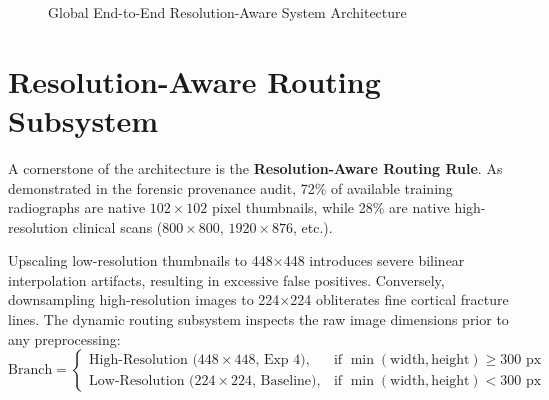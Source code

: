 \documentclass[12pt, a4paper]{report}
\begin{document}
\begin{figure}[htbp]
\caption{Global End-to-End Resolution-Aware System Architecture}
\label{fig:arch_flow}
\end{figure}

\section{Resolution-Aware Routing Subsystem}
A cornerstone of the architecture is the \textbf{Resolution-Aware Routing Rule}. As demonstrated in the forensic provenance audit, 72\% of available training radiographs are native $102\times 102$ pixel thumbnails, while 28\% are native high-resolution clinical scans ($800\times 800$, $1920\times 876$, etc.). 

Upscaling low-resolution thumbnails to 448$\times$448 introduces severe bilinear interpolation artifacts, resulting in excessive false positives. Conversely, downsampling high-resolution images to 224$\times$224 obliterates fine cortical fracture lines. The dynamic routing subsystem inspects the raw image dimensions prior to any preprocessing:
\begin{equation}
    \text{Branch} = 
    \begin{cases} 
        \text{High-Resolution (448}\times\text{448, Exp 4)}, & \text{if } \min(\text{width}, \text{height}) \ge 300\text{ px} \\
        \text{Low-Resolution (224}\times\text{224, Baseline)}, & \text{if } \min(\text{width}, \text{height}) < 300\text{ px}
    \end{cases}
\end{equation}
\end{document}
